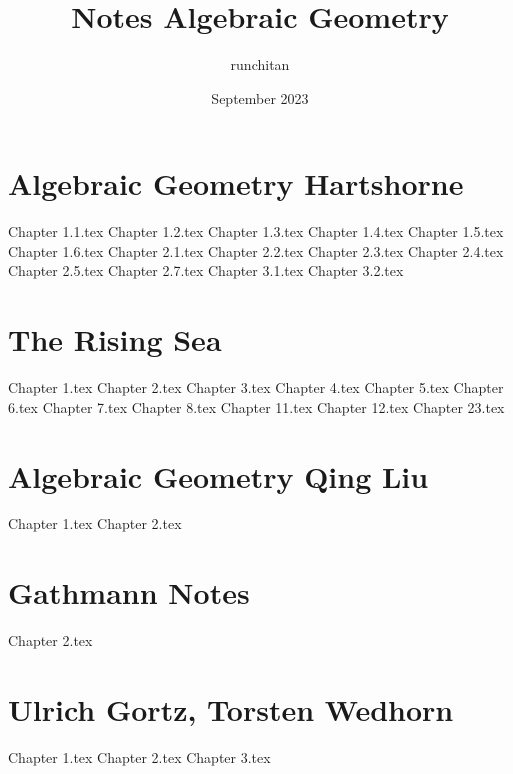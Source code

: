 \documentclass{book}
\title{Notes Algebraic Geometry}
\author{runchitan }
\date{September 2023}
\begin{document}

\tableofcontents

\newpage\part{Algebraic Geometry Hartshorne}
{Chapter 1.1.tex}
{Chapter 1.2.tex}
{Chapter 1.3.tex}
{Chapter 1.4.tex}
{Chapter 1.5.tex}
{Chapter 1.6.tex}
{Chapter 2.1.tex}
{Chapter 2.2.tex}
{Chapter 2.3.tex}
{Chapter 2.4.tex}
{Chapter 2.5.tex}
{Chapter 2.7.tex}
{Chapter 3.1.tex}
{Chapter 3.2.tex}

\newpage\part{The Rising Sea}
{Chapter 1.tex}
{Chapter 2.tex}
{Chapter 3.tex}
{Chapter 4.tex}
{Chapter 5.tex}
{Chapter 6.tex}
{Chapter 7.tex}
{Chapter 8.tex}
{Chapter 11.tex}
{Chapter 12.tex}
{Chapter 23.tex}

\newpage\part{Algebraic Geometry Qing Liu}
{Chapter 1.tex}
{Chapter 2.tex}

\newpage\part{Gathmann Notes}
{Chapter 2.tex}

\newpage\part{Ulrich Gortz, Torsten Wedhorn}
{Chapter 1.tex}
{Chapter 2.tex}
{Chapter 3.tex}

\newpage


\end{document}

